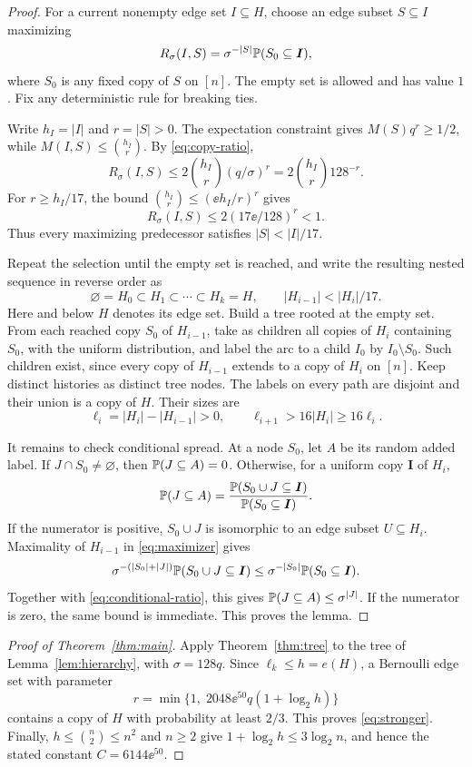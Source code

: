 \begin{proof}
For a current nonempty edge set $I\subseteq H$, choose an edge
subset $S\subseteq I$ maximizing
\begin{equation}\label{eq:maximizer}
 R_\sigma(I,S)=\sigma^{-|S|}\mathbb P(S_0\subseteq\boldsymbol I),
\end{equation}
where $S_0$ is any fixed copy of $S$ on $[n]$. The empty set is
allowed and has value $1$. Fix any deterministic rule for breaking
ties.

Write $h_I=|I|$ and $r=|S|>0$. The expectation constraint gives
$M(S)q^r\ge1/2$, while $M(I,S)\le\binom{h_I}{r}$.
By \eqref{eq:copy-ratio},
\[
 R_\sigma(I,S)\le2\binom{h_I}{r}(q/\sigma)^r
           =2\binom{h_I}{r}128^{-r}.
\]
For $r\ge h_I/17$, the bound
$\binom{h_I}{r}\le(\ee h_I/r)^r$ gives
\[
 R_\sigma(I,S)\le2(17\ee/128)^r<1.
\]
Thus every maximizing predecessor satisfies $|S|<|I|/17$.

Repeat the selection until the empty set is reached, and write
the resulting nested sequence in reverse order as
\[
 \varnothing=H_0\subset H_1\subset\cdots\subset H_k=H,
 \qquad |H_{i-1}|<|H_i|/17.
\]
Here and below $H$ denotes its edge set. Build a tree rooted at the
empty set. From each reached copy $S_0$ of $H_{i-1}$, take as
children all copies of $H_i$ containing $S_0$, with the uniform
distribution, and label the arc to a child $I_0$ by $I_0\setminus S_0$.
Such children exist, since every copy of $H_{i-1}$ extends to a copy
of $H_i$ on $[n]$. Keep distinct histories as distinct tree nodes.
The labels on every path are disjoint and their union is a copy of
$H$. Their sizes are
\[
 \ell_i=|H_i|-|H_{i-1}|>0,
 \qquad
 \ell_{i+1}>16|H_i|\ge16\ell_i.
\]

It remains to check conditional spread. At a node $S_0$, let $A$
be its random added label. If $J\cap S_0\ne\varnothing$, then
$\mathbb P(J\subseteq A)=0$. Otherwise, for a uniform copy
$\boldsymbol I$ of $H_i$,
\begin{equation}\label{eq:conditional-ratio}
 \mathbb P(J\subseteq A)=
 \frac{\mathbb P(S_0\cup J\subseteq\boldsymbol I)}
      {\mathbb P(S_0\subseteq\boldsymbol I)}.
\end{equation}
If the numerator is positive, $S_0\cup J$ is isomorphic to an edge
subset $U\subseteq H_i$. Maximality of $H_{i-1}$ in
\eqref{eq:maximizer} gives
\[
 \sigma^{-(|S_0|+|J|)}\mathbb P(S_0\cup J\subseteq\boldsymbol I)
 \le \sigma^{-|S_0|}\mathbb P(S_0\subseteq\boldsymbol I).
\]
Together with \eqref{eq:conditional-ratio}, this gives
$\mathbb P(J\subseteq A)\le\sigma^{|J|}$. If the numerator is zero, the same
bound is immediate. This proves the lemma.
\end{proof}

\begin{proof}[Proof of Theorem~\ref{thm:main}]
Apply Theorem~\ref{thm:tree} to the tree of
Lemma~\ref{lem:hierarchy}, with $\sigma=128q$. Since
$\ell_k\le h=e(H)$, a Bernoulli edge set with parameter
\[
 r=\min\{1,\;2048\ee^{50}q(1+\log_2 h)\}
\]
contains a copy of $H$ with probability at least $2/3$. This proves
\eqref{eq:stronger}. Finally, $h\le\binom n2\le n^2$ and $n\ge2$
give $1+\log_2 h\le3\log_2 n$, and hence the stated constant
$C=6144\ee^{50}$.
\end{proof}


